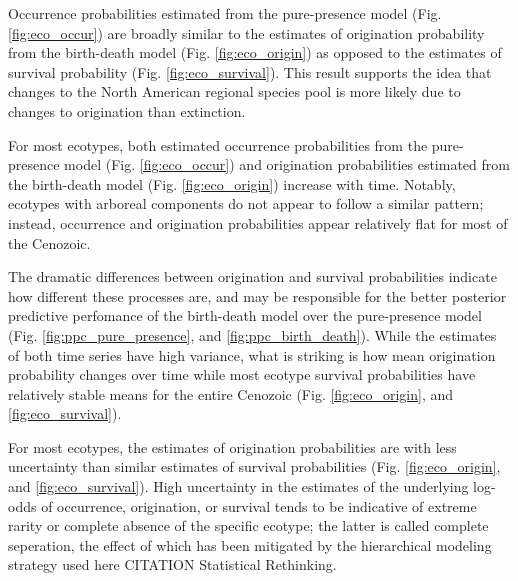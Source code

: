 \documentclass[12pt,letterpaper]{article}
\begin{document}
Occurrence probabilities estimated from the pure-presence model (Fig. \ref{fig:eco_occur}) are broadly similar to the estimates of origination probability from the birth-death model (Fig. \ref{fig:eco_origin}) as opposed to the estimates of survival probability (Fig. \ref{fig:eco_survival}). This result supports the idea that changes to the North American regional species pool is more likely due to changes to origination than extinction.

For most ecotypes, both estimated occurrence probabilities from the pure-presence model (Fig. \ref{fig:eco_occur}) and origination probabilities estimated from the birth-death model (Fig. \ref{fig:eco_origin}) increase with time. Notably, ecotypes with arboreal components do not appear to follow a similar pattern; instead, occurrence and origination probabilities appear relatively flat for most of the Cenozoic.

The dramatic differences between origination and survival probabilities indicate how different these processes are, and may be responsible for the better posterior predictive perfomance of the birth-death model over the pure-presence model (Fig. \ref{fig:ppc_pure_presence}, and \ref{fig:ppc_birth_death}). While the estimates of both time series have high variance, what is striking is how mean origination probability changes over time while most ecotype survival probabilities have relatively stable means for the entire Cenozoic (Fig. \ref{fig:eco_origin}, and \ref{fig:eco_survival}).

For most ecotypes, the estimates of origination probabilities are with less uncertainty than similar estimates of survival probabilities (Fig. \ref{fig:eco_origin}, and \ref{fig:eco_survival}). High uncertainty in the estimates of the underlying log-odds of occurrence, origination, or survival tends to be indicative of extreme rarity or complete absence of the specific ecotype; the latter is called complete seperation, the effect of which has been mitigated by the hierarchical modeling strategy used here \citep{Gelman2013d,Gelman2007} CITATION Statistical Rethinking.
\end{document}
